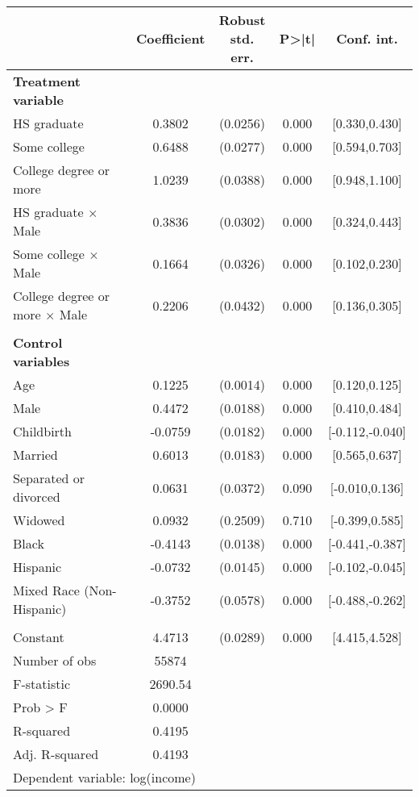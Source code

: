{
\def\sym#1{\ifmmode^{#1}\else\(^{#1}\)\fi}
\begin{tabular}{l*{1}{cccc}}
\toprule
                    & Coefficient&\shortstack{Robust\\std. err.}&       P>|t|&  Conf. int.\\
\midrule
\textbf{Treatment variable}&            &            &            &            \\
HS graduate         &      0.3802&    (0.0256)&       0.000&[0.330,0.430]\\
Some college        &      0.6488&    (0.0277)&       0.000&[0.594,0.703]\\
College degree or more&      1.0239&    (0.0388)&       0.000&[0.948,1.100]\\
HS graduate $\times$ Male&      0.3836&    (0.0302)&       0.000&[0.324,0.443]\\
Some college $\times$ Male&      0.1664&    (0.0326)&       0.000&[0.102,0.230]\\
College degree or more $\times$ Male&      0.2206&    (0.0432)&       0.000&[0.136,0.305]\\
\\ \textbf{Control variables}&            &            &            &            \\
Age                 &      0.1225&    (0.0014)&       0.000&[0.120,0.125]\\
Male                &      0.4472&    (0.0188)&       0.000&[0.410,0.484]\\
Childbirth          &     -0.0759&    (0.0182)&       0.000&[-0.112,-0.040]\\
Married             &      0.6013&    (0.0183)&       0.000&[0.565,0.637]\\
Separated or divorced&      0.0631&    (0.0372)&       0.090&[-0.010,0.136]\\
Widowed             &      0.0932&    (0.2509)&       0.710&[-0.399,0.585]\\
Black               &     -0.4143&    (0.0138)&       0.000&[-0.441,-0.387]\\
Hispanic            &     -0.0732&    (0.0145)&       0.000&[-0.102,-0.045]\\
Mixed Race (Non-Hispanic)&     -0.3752&    (0.0578)&       0.000&[-0.488,-0.262]\\
                    &            &            &            &            \\
Constant            &      4.4713&    (0.0289)&       0.000&[4.415,4.528]\\
\midrule
Number of obs       &       55874&            &            &            \\
F-statistic         &     2690.54&            &            &            \\
Prob > F            &      0.0000&            &            &            \\
R-squared           &      0.4195&            &            &            \\
Adj. R-squared      &      0.4193&            &            &            \\
\bottomrule
\multicolumn{5}{l}{\footnotesize Dependent variable: log(income)}\\
\end{tabular}
}
